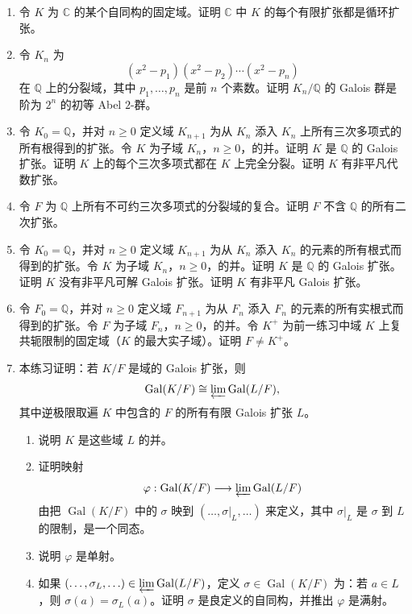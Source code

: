 \begin{enumerate}[label=\arabic*.]
\item 令 $K$ 为 $\mathbb C$ 的某个自同构的固定域。证明 $\mathbb C$ 中 $K$ 的每个有限扩张都是循环扩张。

\item 令 $K_n$ 为
\[
(x^2-p_1)(x^2-p_2)\cdots(x^2-p_n)
\]
在 $\mathbb Q$ 上的分裂域，其中 $p_1,\ldots,p_n$ 是前 $n$ 个素数。证明 $K_n/\mathbb Q$ 的 Galois 群是阶为 $2^n$ 的初等 Abel $2$-群。

\item 令 $K_0=\mathbb Q$，并对 $n\geq 0$ 定义域 $K_{n+1}$ 为从 $K_n$ 添入 $K_n$ 上所有三次多项式的所有根得到的扩张。令 $K$ 为子域 $K_n$，$n\geq 0$，的并。证明 $K$ 是 $\mathbb Q$ 的 Galois 扩张。证明 $K$ 上的每个三次多项式都在 $K$ 上完全分裂。证明 $K$ 有非平凡代数扩张。

\item 令 $F$ 为 $\mathbb Q$ 上所有不可约三次多项式的分裂域的复合。证明 $F$ 不含 $\mathbb Q$ 的所有二次扩张。

\item 令 $K_0=\mathbb Q$，并对 $n\geq 0$ 定义域 $K_{n+1}$ 为从 $K_n$ 添入 $K_n$ 的元素的所有根式而得到的扩张。令 $K$ 为子域 $K_n$，$n\geq 0$，的并。证明 $K$ 是 $\mathbb Q$ 的 Galois 扩张。证明 $K$ 没有非平凡可解 Galois 扩张。证明 $K$ 有非平凡 Galois 扩张。

\item 令 $F_0=\mathbb Q$，并对 $n\geq 0$ 定义域 $F_{n+1}$ 为从 $F_n$ 添入 $F_n$ 的元素的所有实根式而得到的扩张。令 $F$ 为子域 $F_n$，$n\geq 0$，的并。令 $K^+$ 为前一练习中域 $K$ 上复共轭限制的固定域（$K$ 的最大实子域）。证明 $F\neq K^+$。

\item 本练习证明：若 $K/F$ 是域的 Galois 扩张，则
\[
\operatorname{Gal}(K/F)\cong \varprojlim \operatorname{Gal}(L/F),
\]
其中逆极限取遍 $K$ 中包含的 $F$ 的所有有限 Galois 扩张 $L$。
\begin{enumerate}[label=(\alph*)]
\item 说明 $K$ 是这些域 $L$ 的并。
\item 证明映射
\[
\varphi:\operatorname{Gal}(K/F)\longrightarrow \varprojlim \operatorname{Gal}(L/F)
\]
由把 $\operatorname{Gal}(K/F)$ 中的 $\sigma$ 映到 $(\ldots,\sigma|_L,\ldots)$ 来定义，其中 $\sigma|_L$ 是 $\sigma$ 到 $L$ 的限制，是一个同态。
\item 说明 $\varphi$ 是单射。
\item 如果 $(\ldots,\sigma_L,\ldots)\in \varprojlim \operatorname{Gal}(L/F)$，定义 $\sigma\in \operatorname{Gal}(K/F)$ 为：若 $a\in L$，则 $\sigma(a)=\sigma_L(a)$。证明 $\sigma$ 是良定义的自同构，并推出 $\varphi$ 是满射。
\end{enumerate}
\end{enumerate}

